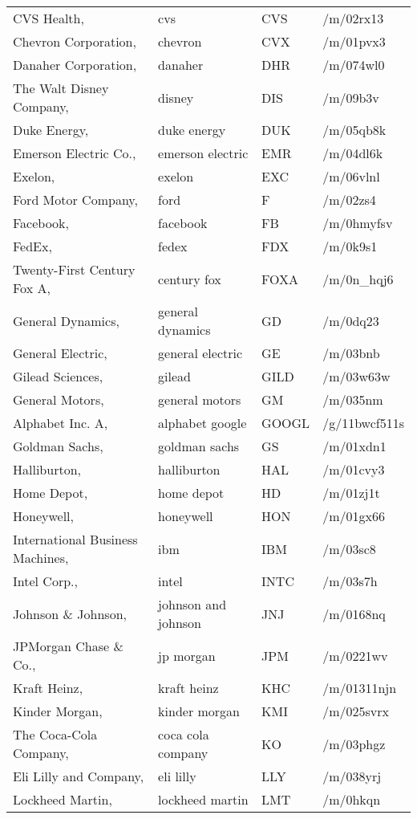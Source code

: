 \begin{longtable}[c]{llll}
CVS Health, & cvs & CVS & /m/02rx13 \\
Chevron Corporation, & chevron & CVX & /m/01pvx3 \\
Danaher Corporation, & danaher & DHR & /m/074wl0 \\
The Walt Disney Company, & disney & DIS & /m/09b3v \\
Duke Energy, & duke energy & DUK & /m/05qb8k \\
Emerson Electric Co., & emerson electric & EMR & /m/04dl6k \\
Exelon, & exelon & EXC & /m/06vlnl \\
Ford Motor Company, & ford & F & /m/02zs4 \\
Facebook, & facebook & FB & /m/0hmyfsv \\
FedEx, & fedex & FDX & /m/0k9s1 \\
Twenty-First Century Fox A, & century fox & FOXA & /m/0n\_hqj6 \\
General Dynamics, & general dynamics & GD & /m/0dq23 \\
General Electric, & general electric & GE & /m/03bnb \\
Gilead Sciences, & gilead & GILD & /m/03w63w \\
General Motors, & general motors & GM & /m/035nm \\
Alphabet Inc. A, & alphabet google & GOOGL & /g/11bwcf511s \\
Goldman Sachs, & goldman sachs & GS & /m/01xdn1 \\
Halliburton, & halliburton & HAL & /m/01cvy3 \\
Home Depot, & home depot & HD & /m/01zj1t \\
Honeywell, & honeywell & HON & /m/01gx66 \\
International Business Machines, & ibm & IBM & /m/03sc8 \\
Intel Corp., & intel & INTC & /m/03s7h \\
Johnson \& Johnson, & johnson and johnson & JNJ & /m/0168nq \\
JPMorgan Chase \& Co., & jp morgan & JPM & /m/0221wv \\
Kraft Heinz, & kraft heinz & KHC & /m/01311njn \\
Kinder Morgan, & kinder morgan & KMI & /m/025svrx \\
The Coca-Cola Company, & coca cola company & KO & /m/03phgz \\
Eli Lilly and Company, & eli lilly & LLY & /m/038yrj \\
Lockheed Martin, & lockheed martin & LMT & /m/0hkqn \\

\end{longtable}
